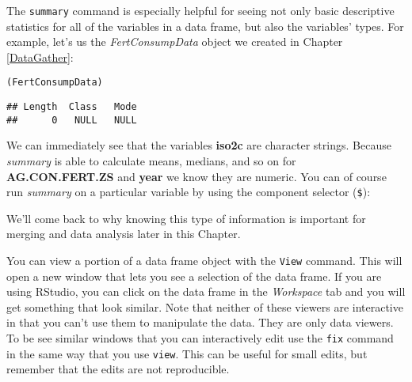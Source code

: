 The \texttt{summary} command is especially helpful for seeing not only basic descriptive statistics for all of the variables in a data frame, but also the variables' types. For example, let's us the \emph{FertConsumpData} object we created in Chapter \ref{DataGather}:

{\small
\begin{knitrout}
\color{fgcolor}\begin{kframe}
\begin{alltt}
(FertConsumpData)
\end{alltt}
\begin{verbatim}
## Length  Class   Mode 
##      0   NULL   NULL
\end{verbatim}
\end{kframe}
\end{knitrout}

}

\noindent We can immediately see that the variables \textbf{iso2c} are character strings. Because \emph{summary} is able to calculate means, medians, and so on for \textbf{AG.CON.FERT.ZS} and \textbf{year} we know they are numeric. You can of course run \emph{summary} on a particular variable by using the component selector (\verb|$|):

\begin{knitrout}
\color{fgcolor}
\end{knitrout}


\noindent We'll come back to why knowing this type of information is important for merging and data analysis later in this Chapter.

You can view a portion of a data frame object with the \texttt{View} command. This will open a new window that lets you see a selection of the data frame. If you are using RStudio, you can click on the data frame in the \emph{Workspace} tab and you will get something that look similar. Note that neither of these viewers are interactive in that you can't use them to manipulate the data. They are only data viewers. To be see similar windows that you can interactively edit use the \texttt{fix} command in the same way that you use \texttt{view}. This can be useful for small edits, but remember that the edits are not reproducible.

